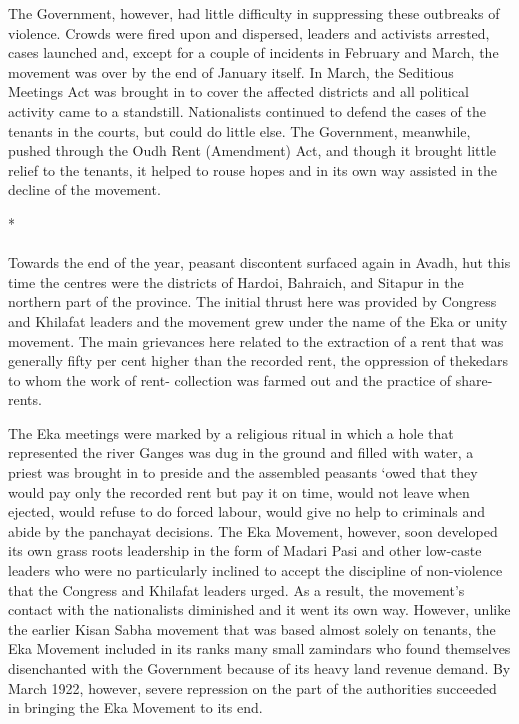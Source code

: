 The Government, however, had little difficulty in suppressing these outbreaks of violence. Crowds were fired upon and dispersed, leaders and activists arrested, cases launched and, except for a couple of incidents in February and March, the movement was over by the end of January itself. In March, the Seditious Meetings Act was brought in to cover the affected districts and all political activity came to a standstill. Nationalists continued to defend the cases of the tenants in the courts, but could do little else. The Government, meanwhile, pushed through the Oudh Rent (Amendment) Act, and though it brought little relief to the tenants, it helped to rouse hopes and in its own way assisted in the decline of the movement.

\begin{center}*\end{center}

\paragraph*{}


Towards the end of the year, peasant discontent surfaced again in Avadh, hut this time the centres were the districts of Hardoi, Bahraich, and Sitapur in the northern part of the province. The initial thrust here was provided by Congress and Khilafat leaders and the movement grew under the name of the Eka or unity movement. The main grievances here related to the extraction of a rent that was generally fifty per cent higher than the recorded rent, the oppression of thekedars to whom the work of rent- collection was farmed out and the practice of share-rents.

The Eka meetings were marked by a religious ritual in which a hole that represented the river Ganges was dug in the ground and filled with water, a priest was brought in to preside and the assembled peasants `owed that they would pay only the recorded rent but pay it on time, would not leave when ejected, would refuse to do forced labour, would give no help to criminals and abide by the panchayat decisions. The Eka Movement, however, soon developed its own grass­ roots leadership in the form of Madari Pasi and other low-caste leaders who were no particularly inclined to accept the discipline of non-violence that the Congress and Khilafat leaders urged. As a result, the movement's contact with the nationalists diminished and it went its own way. However, unlike the earlier Kisan Sabha movement that was based almost solely on tenants, the Eka Movement included in its ranks many small zamindars who found themselves disenchanted with the Government because of its heavy land revenue demand. By March 1922, however, severe repression on the part of the authorities succeeded in bringing the Eka Movement to its end.

